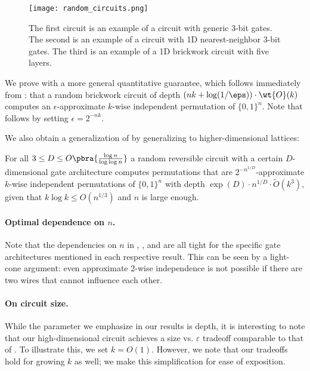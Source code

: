 \begin{figure}[t]
    \centering 
    \texttt{[image: random\_circuits.png]}
    \caption{The first circuit is an example of a circuit with generic 3-bit gates. The second is an example of a circuit with 1D nearest-neighbor 3-bit gates. The third is an example of a 1D brickwork circuit with five layers.}
    \label{fig:nonlocal local brickwork}
\end{figure}

We prove  with a more general quantitative guarantee, which follows immediately from : that a random brickwork circuit of depth $(nk + \log(1/\eps)) \cdot \wt{O}(k)$ computes an $\epsilon$-approximate $k$-wise independent permutation of $\{0,1\}^n$. Note that  follows by setting $\epsilon=2^{-nk}$.

We also obtain a generalization of  by generalizing  to higher-dimensional lattices:
\begin{theorem}\label{thm:genresult}
    For all $3 \leq D \leq O\pbra{\frac{\log n}{\log \log n}}$ a random reversible circuit with a certain $D$-dimensional gate architecture computes permutations that are $2^{-n^{1/D}}$-approximate $k$-wise independent permutations of $\{0,1\}^n$ with depth $\exp(D) \cdot n^{1/D} \cdot \widetilde{O}(k^3)$, given that $k \log k \leq O(n^{1/3})$ and $n$ is large enough.
\end{theorem}

\paragraph{Optimal dependence on $n$.} Note that the dependencies on $n$ in , , and  are all tight for the specific gate architectures mentioned in each respective result. This can be seen by a light-cone argument: even approximate 2-wise independence is not possible if there are two wires that cannot influence each other.

\paragraph{On circuit size.} While the parameter we emphasize in our results is depth, it is interesting to note that our high-dimensional circuit achieves a size vs. $\varepsilon$ tradeoff comparable to that of \cite{gretta2024more}. To illustrate this, we set $k=O(1)$. However, we note that our tradeoffs hold for growing $k$ as well; we make this simplification for ease of exposition. 

